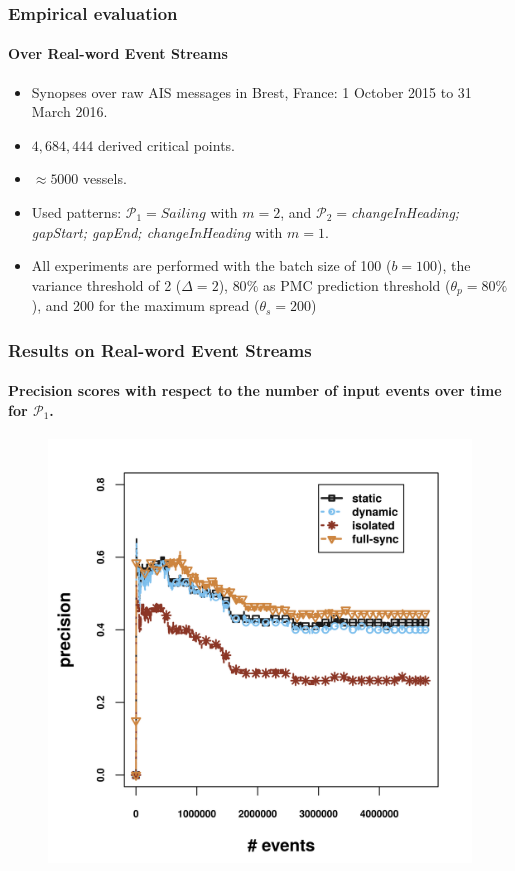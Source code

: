 \begin{frame}
	
	\frametitle{Empirical evaluation }
	\framesubtitle{Over Real-word Event Streams}
\begin{itemize}
	\item<1-> Synopses over raw AIS messages in Brest, France: 1 October 2015 to 31 March 2016. 
	
	\item<1->$ 4,684,444$ derived critical points.
	
	\item<1->  $\approx5000$ vessels.
	\item<only@1> Used patterns: 
	$\mathcal{P}_1=Sailing$ with $m=2$, and  $\mathcal{P}_2=$\textit{changeInHeading; gapStart; gapEnd; changeInHeading} with $m=1$. 
	\item<1-> All experiments are performed with the batch size of 100  ($b=100$), the variance threshold of 2 ($\Delta=2$), $80\%$ as PMC prediction threshold ($\theta_{p}=80\%$), and 200 for the maximum spread ($\theta_{s}=200$)
\end{itemize}
	
\end{frame}


\begin{frame}
	
	\frametitle{Results on Real-word Event Streams }
	\framesubtitle{Precision scores with respect to the number of input events over time for $\mathcal{P}_1$.}
	
	\begin{figure}[H]
		\centering
		\includegraphics[width=.9\textwidth,height=.8\textheight]{../chapters/figures/synopses/new/precision_p1.png}
		
	\end{figure}
	
\end{frame}



